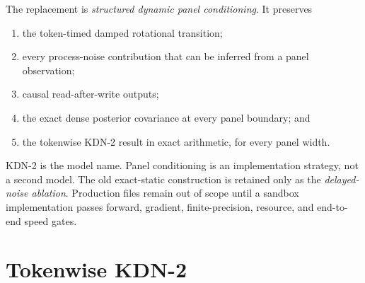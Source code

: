\documentclass[11pt]{article}
\begin{document}
The replacement is \emph{structured dynamic panel conditioning}.  It preserves

\begin{enumerate}[leftmargin=1.8em,itemsep=2pt]
  \item the token-timed damped rotational transition;
  \item every process-noise contribution that can be inferred from a panel observation;
  \item causal read-after-write outputs;
  \item the exact dense posterior covariance at every panel boundary; and
  \item the tokenwise KDN-2 result in exact arithmetic, for every panel width.
\end{enumerate}

KDN-2 is the model name.  Panel conditioning is an implementation strategy, not a second model.
The old exact-static construction is retained only as the \emph{delayed-noise ablation}.
Production files remain out of scope until a sandbox implementation passes forward, gradient,
finite-precision, resource, and end-to-end speed gates.

\section{Tokenwise KDN-2}
\end{document}
